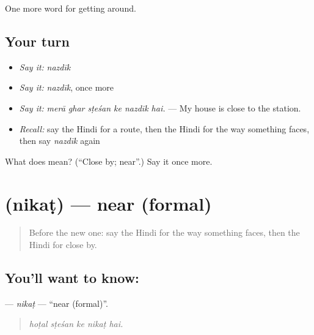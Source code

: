 \begin{grammarlens}[title={What you've built}]
One more word for getting around.
\end{grammarlens}

\subsection*{Your turn}
\begin{itemize}
\raggedright
  \item \emph{Say it:} \emph{nazdīk}
  \item \emph{Say it:} \emph{nazdīk}, once more
  \item \emph{Say it:} \emph{merā ghar sṭeśan ke nazdīk hai.} — My house is close to the station.
  \item \emph{Recall:} say the Hindi for a route, then the Hindi for the way something faces, then say \emph{nazdīk} again
\end{itemize}

\begin{tcolorbox}[breakable,colback=teal!4,colframe=teal!35!black,title={Before you move on}]
What does  mean? (\textquotedblleft{}Close by; near\textquotedblright{}.) Say it once more.
\end{tcolorbox}
\section[\texorpdfstring{\hi{निकट} (nikaṭ)}{निकट (nikaṭ)}]{ (nikaṭ) — near (formal)}

\label{lesson:HI-C418-nikat}



\begin{quote}
Before the new one: say the Hindi for the way something faces, then the Hindi for close by.
\end{quote}

\subsection*{You'll want to know: }
\textbf{} — \emph{nikaṭ} — \textquotedblleft{}near (formal)\textquotedblright{}.

\begin{quote}
    
\end{quote}

\begin{quote}
\emph{hoṭal sṭeśan ke nikaṭ hai.}
\end{quote}

